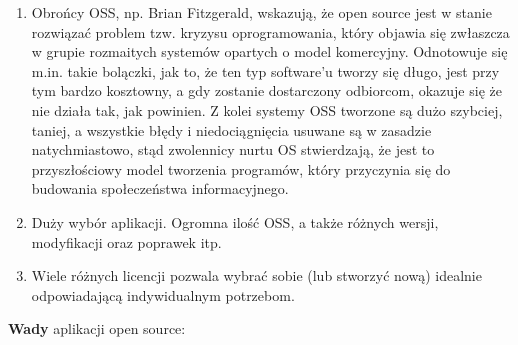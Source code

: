 \documentclass{article}
\begin{document}
\begin{enumerate}
    \item Obrońcy OSS, np. Brian Fitzgerald, wskazują, że open source jest w stanie rozwiązać problem tzw. kryzysu oprogramowania, który objawia się zwłaszcza w grupie rozmaitych systemów opartych o model komercyjny. Odnotowuje się m.in. takie bolączki, jak to, że ten typ software'u tworzy się długo, jest przy tym bardzo kosztowny, a gdy zostanie dostarczony odbiorcom, okazuje się że nie działa tak, jak powinien. Z kolei systemy OSS tworzone są dużo szybciej, taniej, a wszystkie błędy i niedociągnięcia usuwane są w zasadzie natychmiastowo, stąd zwolennicy nurtu OS stwierdzają, że jest to przyszłościowy model tworzenia programów, który przyczynia się do budowania społeczeństwa informacyjnego\cite{Kotula}.
    
    \item Duży wybór aplikacji. Ogromna ilość OSS, a także różnych wersji, modyfikacji oraz poprawek itp\cite{Kotula}.
    
    \item Wiele różnych licencji pozwala wybrać sobie (lub stworzyć nową) idealnie odpowiadającą indywidualnym potrzebom\cite{Kotula}. 
\end{enumerate}

\textbf{Wady} aplikacji open source:
\end{document}
